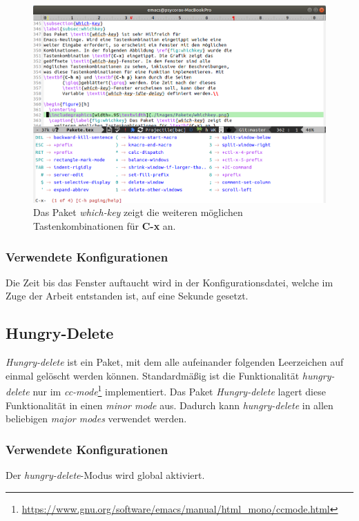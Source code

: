 \begin{figure}[h]
  \centering
  \includegraphics[width=.95\textwidth]{./images/Pakete/whichkey.png}
  \caption{\label{fig:whichkey} Das Paket \textit{which-key} zeigt die
    weiteren möglichen Tastenkombinationen für \textbf{C-x} an.}
\end{figure}

\subsubsection{Verwendete Konfigurationen}
Die Zeit bis das Fenster auftaucht wird in der Konfigurationsdatei,
welche im Zuge der Arbeit entstanden ist, auf eine Sekunde gesetzt.\\

\subsection{Hungry-Delete}
\label{subsec:hungrydelete}
\textit{Hungry-delete} ist ein Paket, mit dem alle aufeinander
folgenden Leerzeichen auf einmal gelöscht werden können. Standardmäßig
ist die Funktionalität \textit{hungry-delete} nur im
\textit{cc-mode}\footnote{\url{https://www.gnu.org/software/emacs/manual/html_mono/ccmode.html}}
implementiert. Das Paket \textit{Hungry-delete} lagert diese
Funktionalität in einen \textit{minor mode} aus. Dadurch kann
\textit{hungry-delete} in allen beliebigen \textit{major modes}
verwendet werden. \cite{HungryDelete}\\

\subsubsection{Verwendete Konfigurationen}
Der \textit{hungry-delete}-Modus wird global aktiviert.\\

